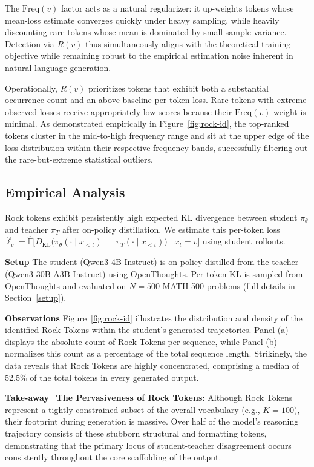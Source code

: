 The $\mathrm{Freq}(v)$ factor acts as a natural regularizer: it up-weights tokens whose mean-loss estimate converges quickly under heavy sampling, while heavily discounting rare tokens whose mean is dominated by small-sample variance. Detection via $R(v)$ thus simultaneously aligns with the theoretical training objective while remaining robust to the empirical estimation noise inherent in natural language generation. 

Operationally, $R(v)$ prioritizes tokens that exhibit both a substantial occurrence count and an above-baseline per-token loss. Rare tokens with extreme observed losses receive appropriately low scores because their $\mathrm{Freq}(v)$ weight is minimal. As demonstrated empirically in Figure~\ref{fig:rock-id}, the top-ranked tokens cluster in the mid-to-high frequency range and sit at the upper edge of the loss distribution within their respective frequency bands, successfully filtering out the rare-but-extreme statistical outliers.








\subsection{Empirical Analysis}
\label{sec:rock_empirical}
Rock tokens exhibit persistently high expected KL divergence between student $\pi_\theta$ and teacher $\pi_T$ after on-policy distillation. We estimate this per-token loss $\widehat\ell_v = \widehat{\mathbb{E}}\big[D_{\mathrm{KL}}\!\big(\pi_\theta(\cdot \mid x_{<t}) \;\|\; \pi_T(\cdot \mid x_{<t})\big) \mid x_t = v\big]$ using student rollouts.

\textbf{Setup} The student (Qwen3-4B-Instruct) is on-policy distilled from the teacher (Qwen3-30B-A3B-Instruct) using OpenThoughts. Per-token KL is sampled from OpenThoughts and evaluated on $N{=}500$ MATH-500 problems (full details in Section~\ref{setup}).

\textbf{Observations} Figure~\ref{fig:rock-id} illustrates the distribution and density of the identified Rock Tokens within the student's generated trajectories. Panel (a) displays the absolute count of Rock Tokens per sequence, while Panel (b) normalizes this count as a percentage of the total sequence length. Strikingly, the data reveals that Rock Tokens are highly concentrated, comprising a median of 52.5\% of the total tokens in every generated output.

\begin{takeaway}
\textcolor{tabblue}{\textbf{Take-away}}~ \textbf{The Pervasiveness of Rock Tokens:} Although Rock Tokens represent a tightly constrained subset of the overall vocabulary (e.g., $K=100$), their footprint during generation is massive. Over half of the model's reasoning trajectory consists of these stubborn structural and formatting tokens, demonstrating that the primary locus of student-teacher disagreement occurs consistently throughout the core scaffolding of the output.
\end{takeaway}


